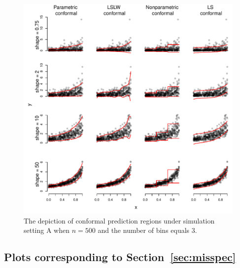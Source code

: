 \documentclass[11pt]{article}\usepackage[]{graphicx}\usepackage[]{color}
\makeatletter
\def\maxwidth{ %
  \ifdim\Gin@nat@width>\linewidth
    \linewidth
  \else
    \Gin@nat@width
  \fi
}
\newenvironment{knitrout}{}{} %
\makeatother
\begin{document}
\newpage
\begin{figure}[h!]
\begin{center}
\begin{knitrout}
\color{fgcolor}
\includegraphics[width=\maxwidth]{figure/conformal-plots-A-500-1} 

\end{knitrout}
\end{center}
\caption{The depiction of conformal prediction regions under simulation 
  setting A when $n = 500$ and the number of bins equals 3.
}
\label{conformal-plots-A-500}
\end{figure}







\newpage
\subsection{Plots corresponding to Section~\ref{sec:misspec}}
\label{sec:misspecplots}
\end{document}
